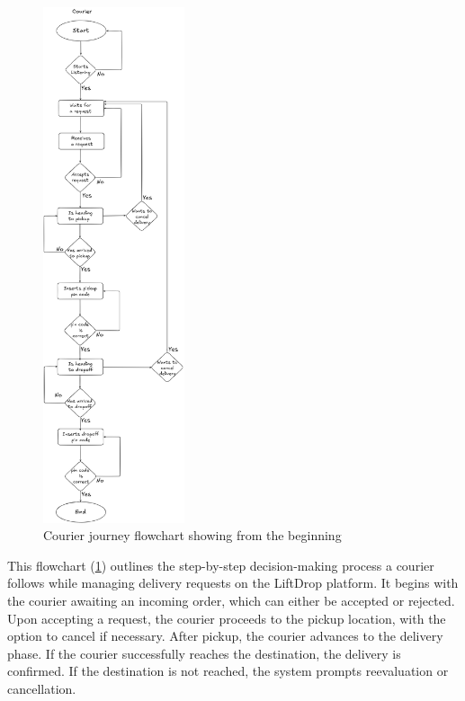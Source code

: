 \bigskip

\begin{figure}[H]
    \centering
    \includegraphics[width=0.37\textwidth]{images/CourierJourney.png} %
    \caption{Courier journey flowchart showing from the beginning}
    \label{fig:courier_journey}
\end{figure}

This flowchart (\ref{fig:courier_journey}) outlines the step-by-step decision-making process a courier follows while managing delivery requests on the LiftDrop platform. It begins with the courier awaiting an incoming order, which can either be accepted or rejected. Upon accepting a request, the courier proceeds to the pickup location, with the option to cancel if necessary. After pickup, the courier advances to the delivery phase. If the courier successfully reaches the destination, the delivery is confirmed. If the destination is not reached, the system prompts reevaluation or cancellation.

\newpage